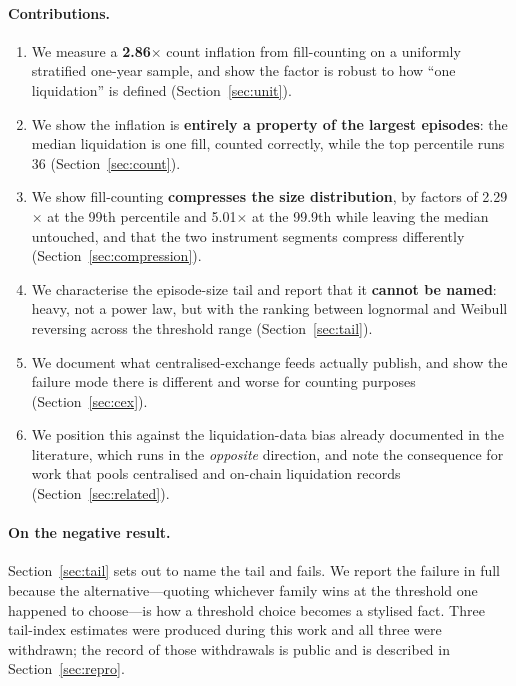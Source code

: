 \documentclass[11pt,a4paper]{article}
\begin{document}
\paragraph{Contributions.}
\begin{enumerate}
\item We measure a \textbf{2.86$\times$} count inflation from fill-counting on a uniformly
      stratified one-year sample, and show the factor is robust to how ``one liquidation'' is
      defined (Section~\ref{sec:unit}).
\item We show the inflation is \textbf{entirely a property of the largest episodes}: the median
      liquidation is one fill, counted correctly, while the top percentile runs 36
      (Section~\ref{sec:count}).
\item We show fill-counting \textbf{compresses the size distribution}, by factors of
      2.29$\times$ at the 99th percentile and 5.01$\times$ at the 99.9th while leaving the
      median untouched, and that the two instrument segments compress differently
      (Section~\ref{sec:compression}).
\item We characterise the episode-size tail and report that it \textbf{cannot be named}:
      heavy, not a power law, but with the ranking between lognormal and Weibull reversing
      across the threshold range (Section~\ref{sec:tail}).
\item We document what centralised-exchange feeds actually publish, and show the failure mode
      there is different and worse for counting purposes (Section~\ref{sec:cex}).
\item We position this against the liquidation-data bias already documented in the literature,
      which runs in the \emph{opposite} direction, and note the consequence for work that pools
      centralised and on-chain liquidation records (Section~\ref{sec:related}).
\end{enumerate}

\paragraph{On the negative result.} Section~\ref{sec:tail} sets out to name the tail and fails.
We report the failure in full because the alternative---quoting whichever family wins at the
threshold one happened to choose---is how a threshold choice becomes a stylised fact. Three
tail-index estimates were produced during this work and all three were withdrawn; the record of
those withdrawals is public and is described in Section~\ref{sec:repro}.
\end{document}
